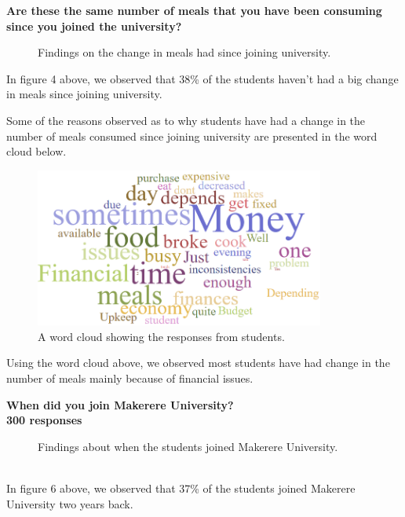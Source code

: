 \documentclass{article}
\begin{document}
\vspace{10pt}
\noindent
\textbf{Are these the same number of meals that you have been consuming since you joined the university?}
\begin{figure}[h]
    \centering
    \caption{Findings on the change in meals had since joining university.}
\end{figure}

\noindent In figure 4 above, we observed that 38\% of the students haven't had a big change in meals since joining university.

\vspace{30pt}

\noindent
Some of the reasons observed as to why students have had a change in the number of meals consumed since joining university are presented in the word cloud below.

\newpage
\begin{figure}[h]
    \centering
    \includegraphics[width=360px]{images/wordcloud1.PNG}
    \caption{A word cloud showing the responses from students.}
\end{figure}

\noindent Using the word cloud above, we observed most students have had change in the number of meals mainly because of financial issues.
\vspace{10pt}

\noindent
\textbf{When did you join Makerere University?\\300 responses}
\begin{figure}[h]
    \centering
    \caption{Findings about when the students joined Makerere University.}
\end{figure}
\\
\noindent In figure 6 above, we observed that 37\% of the students joined Makerere University two years back.
\end{document}
